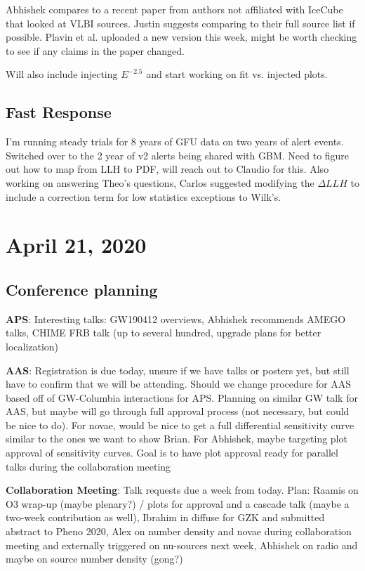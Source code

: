 Abhishek compares to a recent paper from authors not affiliated with IceCube that looked at VLBI sources. Justin suggests comparing to their full source list if possible. Plavin et al. uploaded a new version this week, might be worth checking to see if any claims in the paper changed.

Will also include injecting $E^{-2.5}$ and start working on fit vs. injected plots.

\section{Fast Response}
I'm running steady trials for 8 years of GFU data on two years of alert events. Switched over to the 2 year of v2 alerts being shared with GBM. Need to figure out how to map from LLH to PDF, will reach out to Claudio for this. Also working on answering Theo's questions, Carlos suggested modifying the $\Delta LLH$ to include a correction term for low statistics exceptions to Wilk's.

\chapter{April 21, 2020}
\section{Conference planning}
\textbf{APS}: Interesting talks: GW190412 overviews, Abhishek recommends AMEGO talks, CHIME FRB talk (up to several hundred, upgrade plans for better localization)

\textbf{AAS}: Registration is due today, unsure if we have talks or posters yet, but still have to confirm that we will be attending. Should we change procedure for AAS based off of GW-Columbia interactions for APS. Planning on similar GW talk for AAS, but maybe will go through full approval process (not necessary, but could be nice to do). For novae, would be nice to get a full differential sensitivity curve similar to the ones we want to show Brian. For Abhishek, maybe targeting plot approval of sensitivity curves. Goal is to have plot approval ready for parallel talks during the collaboration meeting

\textbf{Collaboration Meeting}: Talk requests due a week from today. Plan: Raamis on O3 wrap-up (maybe plenary?) / plots for approval and a cascade talk (maybe a two-week contribution as well), Ibrahim in diffuse for GZK and submitted abstract to Pheno 2020, Alex on number density and novae during collaboration meeting and externally triggered on nu-sources next week, Abhishek on radio and maybe on source number density (gong?)

